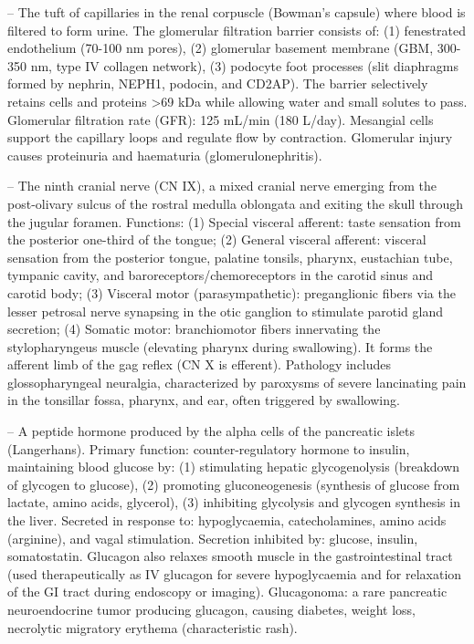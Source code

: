 -- The tuft of capillaries in the renal corpuscle (Bowman's capsule) where blood is filtered to form urine. The glomerular filtration barrier consists of: (1) fenestrated endothelium (70-100 nm pores), (2) glomerular basement membrane (GBM, 300-350 nm, type IV collagen network), (3) podocyte foot processes (slit diaphragms formed by nephrin, NEPH1, podocin, and CD2AP). The barrier selectively retains cells and proteins >69 kDa while allowing water and small solutes to pass. Glomerular filtration rate (GFR): 125 mL/min (180 L/day). Mesangial cells support the capillary loops and regulate flow by contraction. Glomerular injury causes proteinuria and haematuria (glomerulonephritis).

-- The ninth cranial nerve (CN IX), a mixed cranial nerve emerging from the post-olivary sulcus of the rostral medulla oblongata and exiting the skull through the jugular foramen. Functions: (1) Special visceral afferent: taste sensation from the posterior one-third of the tongue; (2) General visceral afferent: visceral sensation from the posterior tongue, palatine tonsils, pharynx, eustachian tube, tympanic cavity, and baroreceptors/chemoreceptors in the carotid sinus and carotid body; (3) Visceral motor (parasympathetic): preganglionic fibers via the lesser petrosal nerve synapsing in the otic ganglion to stimulate parotid gland secretion; (4) Somatic motor: branchiomotor fibers innervating the stylopharyngeus muscle (elevating pharynx during swallowing). It forms the afferent limb of the gag reflex (CN X is efferent). Pathology includes glossopharyngeal neuralgia, characterized by paroxysms of severe lancinating pain in the tonsillar fossa, pharynx, and ear, often triggered by swallowing.

-- A peptide hormone produced by the alpha cells of the pancreatic islets (Langerhans). Primary function: counter-regulatory hormone to insulin, maintaining blood glucose by: (1) stimulating hepatic glycogenolysis (breakdown of glycogen to glucose), (2) promoting gluconeogenesis (synthesis of glucose from lactate, amino acids, glycerol), (3) inhibiting glycolysis and glycogen synthesis in the liver. Secreted in response to: hypoglycaemia, catecholamines, amino acids (arginine), and vagal stimulation. Secretion inhibited by: glucose, insulin, somatostatin. Glucagon also relaxes smooth muscle in the gastrointestinal tract (used therapeutically as IV glucagon for severe hypoglycaemia and for relaxation of the GI tract during endoscopy or imaging). Glucagonoma: a rare pancreatic neuroendocrine tumor producing glucagon, causing diabetes, weight loss, necrolytic migratory erythema (characteristic rash).

